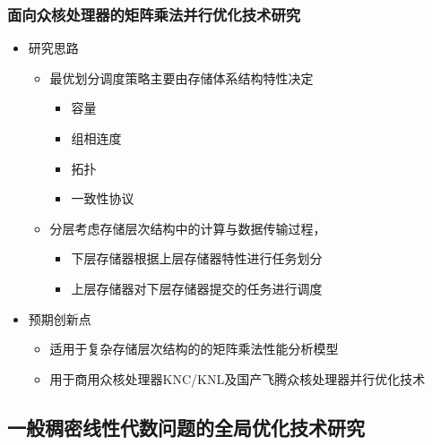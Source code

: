 \documentclass[aspectratio=169]{beamer}
\begin{document}
\begin{frame}
  \frametitle{面向众核处理器的矩阵乘法并行优化技术研究}
  \begin{itemize}
  \item 研究思路
    \begin{itemize}
    \item 最优划分调度策略主要由存储体系结构特性决定
      \begin{itemize}
      \item 容量
      \item 组相连度
      \item 拓扑
      \item 一致性协议
      \end{itemize}
    \item 分层考虑存储层次结构中的计算与数据传输过程，
      \begin{itemize}
      \item 下层存储器根据上层存储器特性进行任务划分
      \item 上层存储器对下层存储器提交的任务进行调度
      \end{itemize}
    \end{itemize}
  \item 预期创新点
    \begin{itemize}
    \item 适用于复杂存储层次结构的的矩阵乘法性能分析模型
    \item 用于商用众核处理器KNC/KNL及国产飞腾众核处理器并行优化技术
    \end{itemize}
  \end{itemize}
\end{frame}


\subsection[全局优化技术研究]{一般稠密线性代数问题的全局优化技术研究}
\end{document}

